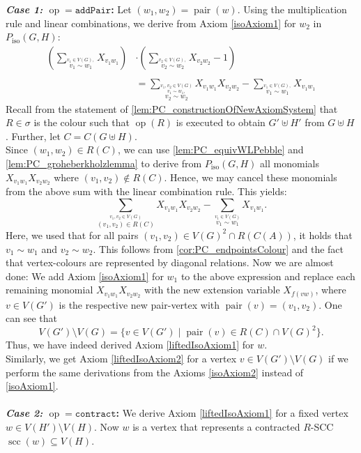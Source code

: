 \documentclass[10pt,a4paper]{article}
\newcommand{\pairOp }{\texttt{addPair}}
\newcommand{\sccOp }{\texttt{contract}}
\newcommand{\op}{\operatorname{op}}
\newcommand{\scc}{{\operatorname{scc}}}
\newcommand{\pair}{{\operatorname{pair}}}
\newcommand{\Piso}{P_{\text{iso}}}
\begin{document}
	\textbf{\textit{Case 1:} $\op = \pairOp$:}
	Let $(w_1,w_2) = \pair(w)$. Using the multiplication rule and linear combinations, we derive from Axiom \eqref{isoAxiom1} for $w_2$ in $\Piso(G,H)$: 
	\begin{align*}
		\left(\sum\limits_{\stackrel{v_1 \in V(G),}{v_1 \sim w_1}} X_{v_1w_1}\right) &\cdot \left(\sum\limits_{\stackrel{v_2 \in V(G),}{v_2 \sim w_2}} X_{v_2w_2} - 1 \right)\\
		\\
		&=\sum\limits_{\stackrel{v_1,v_2 \in V(G)}{\stackrel{v_1 \sim w_1,}{v_2 \sim w_2}}} X_{v_1w_1}X_{v_2w_2} - \sum\limits_{\stackrel{v_1 \in V(G),}{v_1 \sim w_1}} X_{v_1w_1}
	\end{align*}
	Recall from the statement of \autoref{lem:PC_constructionOfNewAxiomSystem} that $R \in \sigma$ is the colour such that $\op(R)$ is executed to obtain $G' \uplus H'$ from $G \uplus H$. Further, let $C = C(G \uplus H)$.\\
	Since $(w_1,w_2) \in R(C)$, we can use \autoref{lem:PC_equivWLPebble} and \autoref{lem:PC_groheberkholzlemma} to derive from $\Piso(G,H)$ all monomials $X_{v_1w_1}X_{v_2w_2}$ where $(v_1,v_2) \notin R(C)$. Hence, we may cancel these monomials from the above sum with the linear combination rule. This yields:
	\[
	\sum\limits_{\stackrel{v_1,v_2 \in V(G)}{(v_1,v_2) \in R(C) }} X_{v_1w_1}X_{v_2w_2} - \sum\limits_{\stackrel{v_1 \in V(G)}{v_1 \sim w_1}} X_{v_1w_1}.
	\]
	Here, we used that for all pairs $(v_1,v_2) \in V(G)^2 \cap R(C(A))$, it holds that $v_1 \sim w_1$ and $v_2 \sim w_2$. This follows from \autoref{cor:PC_endpointsColour} and the fact that vertex-colours are represented by diagonal relations. Now we are almost done: We add Axiom \eqref{isoAxiom1} for $w_1$ to the above expression and replace each remaining monomial $X_{v_1w_1}X_{v_2w_2}$ with the new extension variable $X_{f(vw)}$, where $v \in V(G')$ is the respective new pair-vertex with $\pair(v) = (v_1,v_2)$. One can see that
	\[
	V(G') \setminus V(G) = \{  v \in V(G') \mid \pair(v) \in R(C) \cap V(G)^2   \}.
	\]
	Thus, we have indeed derived Axiom \eqref{liftedIsoAxiom1} for $w$.\\
	Similarly, we get Axiom \eqref{liftedIsoAxiom2} for a vertex $v \in V(G') \setminus V(G)$ if we perform the same derivations from the Axioms \eqref{isoAxiom2} instead of \eqref{isoAxiom1}.\\
	\\
	\textbf{\textit{Case 2:} $\op = \sccOp$:}
	We derive Axiom \eqref{liftedIsoAxiom1} for a fixed vertex $w \in V(H') \setminus V(H)$. Now $w$ is a vertex that represents a contracted $R$-SCC $\scc(w) \subseteq V(H)$.
	
\end{document}
